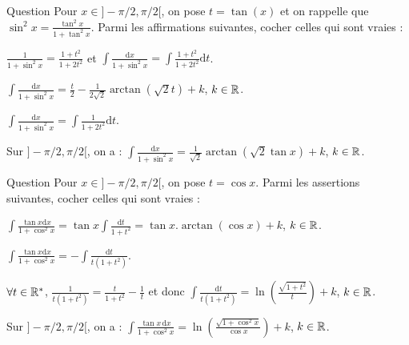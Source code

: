\begin{multi}[multiple,feedback=
{Avec \(t=\tan x\), on aura \(\displaystyle \frac{1}{1+\sin ^2x}=\frac{1+t^2}{1+2t^2}\) et \(\displaystyle \mathrm{d}x=\frac{\mathrm{d}t}{1+t^2}\). D'où
\[\int \frac{\mathrm{d}x}{1+\sin ^2x}=\int \frac{\mathrm{d}t}{1+2t^2}=\frac{1}{\sqrt{2}}\arctan(\sqrt{2}t)+k,\; k\in \Rr.\]
}]{Question}
Pour \(x\in ]-\pi/2,\pi/2[\), on pose \(t=\tan (x)\) et on rappelle que \(\displaystyle \sin ^2x=\frac{\tan ^2x}{1+\tan ^2x}\). Parmi les affirmations suivantes, cocher celles qui sont vraies :

    \item \(\displaystyle \frac{1}{1+\sin ^2x}=\frac{1+t^2}{1+2t^2}\) et \(\displaystyle \int \frac{\mathrm{d}x}{1+\sin ^2x}=\int \frac{1+t^2}{1+2t^2}\mathrm{d}t\).
    \item \(\displaystyle \int \frac{\mathrm{d}x}{1+\sin ^2x}=\frac{t}{2}-\frac{1}{2\sqrt{2}}\arctan(\sqrt{2}t)+k\), \(k\in \mathbb{R}\).
    \item* \(\displaystyle \int \frac{\mathrm{d}x}{1+\sin ^2x}=\int \frac{1}{1+2t^2}\mathrm{d}t\).
    \item* Sur \(]-\pi/2,\pi/2[\), on a : \(\displaystyle \int \frac{\mathrm{d}x}{1+\sin ^2x}=\frac{1}{\sqrt{2}}\arctan\left(\sqrt{2}\tan x\right)+k\), \(k\in \mathbb{R}\).
\end{multi}


\begin{multi}[multiple,feedback=
{Avec \(t=\cos x\), on aura \(\displaystyle \frac{\tan x}{1+\cos ^2x}=\frac{\sin x}{\cos x(1+\cos ^2x)}\) et \(\displaystyle \mathrm{d}t=-\sin x\mathrm{d}x\). D'où
\[\int \frac{\tan x\mathrm{d}x}{1+\cos ^2x}=-\int \frac{\mathrm{d}t}{t(1+t^2)}=\frac{1}{2}\ln (1+t^2)-\ln |t|+k,\; k\in \Rr.\]
}]{Question}
Pour \(x\in ]-\pi/2,\pi/2[\), on pose \(t=\cos x\). Parmi les assertions suivantes, cocher celles qui sont vraies :

    \item \(\displaystyle \int \frac{\tan x\mathrm{d}x}{1+\cos ^2x}=\tan x\int \frac{\mathrm{d}t}{1+t^2}=\tan x.\arctan (\cos x)+k\), \(k\in \mathbb{R}\).
    \item* \(\displaystyle \int \frac{\tan x\mathrm{d}x}{1+\cos ^2x}=-\int \frac{\mathrm{d}t}{t(1+t^2)}\).
    \item \(\forall t\in \mathbb{R}^*\), \(\displaystyle \frac{1}{t(1+t^2)}=\frac{t}{1+t^2}-\frac{1}{t}\) et donc \(\displaystyle \int \frac{\mathrm{d}t}{t(1+t^2)}=\ln \left(\frac{\sqrt{1+t^2}}{t}\right)+k\), \(k\in \mathbb{R}\).
    \item* Sur \(]-\pi/2,\pi/2[\), on a : \(\displaystyle \int \frac{\tan x\, \mathrm{d}x}{1+\cos ^2x}=\ln \left(\frac{\sqrt{1+\cos ^2x}}{\cos x}\right)+k\), \(k\in \mathbb{R}\).
\end{multi}


